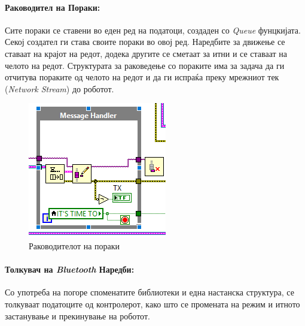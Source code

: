 \documentclass[12pt]{article}
\begin{document}
    \paragraph{Раководител на Пораки:\\} %
    Сите пораки се ставени во еден ред на податоци, создаден со \textit{Queue} фунцкијата. Секој создател ги става своите пораки во овој ред. Наредбите за движење се ставаат на крајот на редот, додека другите се сметаат за итни и се ставаат на челото на редот. Структурата за раковедење со пораките има за задача да ги отчитува пораките од челото на редот и да ги испраќа преку мрежниот тек (\textit{Network Stream}) до роботот.
    \begin{figure}[H]
      \centering
      \includegraphics[width=0.5\linewidth]{./images/message_handler.png}
      \caption{Раководителот на пораки}
    \end{figure}

    \paragraph{Толкувач на \textit{Bluetooth} Наредби:\\}
      Со употреба на погоре споменатите библиотеки и една настанска структура, се толкуваат податоците од контролерот, како што се промената на режим и итното застанување и прекинување на роботот.
\end{document}
